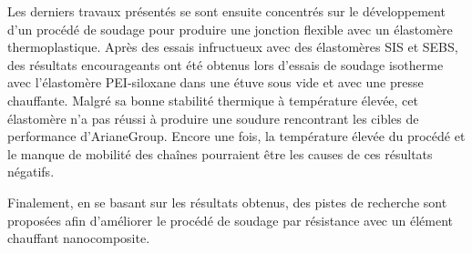 Les derniers travaux présentés se sont ensuite concentrés sur le développement d'un procédé de soudage pour produire une jonction flexible avec un élastomère thermoplastique. 
Après des essais infructueux avec des élastomères SIS et SEBS, des résultats encourageants ont été obtenus lors d'essais de soudage isotherme avec l'élastomère PEI-siloxane dans une étuve sous vide et avec une presse chauffante. 
Malgré sa bonne stabilité thermique à température élevée, cet élastomère n'a pas réussi à produire une soudure rencontrant les cibles de performance d'ArianeGroup. 
Encore une fois, la température élevée du procédé et le manque de mobilité des chaînes pourraient être les causes de ces résultats négatifs. 

Finalement, en se basant sur les résultats obtenus, des pistes de recherche sont proposées afin d'améliorer le procédé de soudage par résistance avec un élément chauffant nanocomposite. 





%
